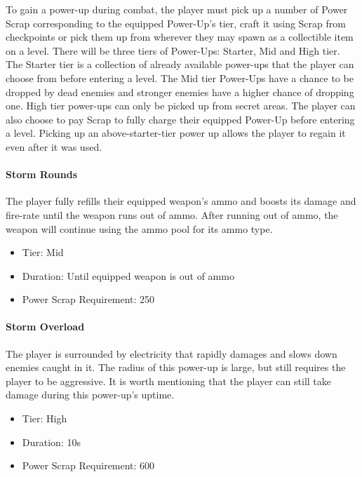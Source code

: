 \documentclass[12pt]{article}
\begin{document}
To gain a power-up during combat, the player must pick up a number of Power Scrap corresponding to the equipped Power-Up's tier, craft it using Scrap from checkpoints or pick them up from wherever they may spawn as a collectible item on a level. There will be three tiers of Power-Ups: Starter, Mid and High tier. The Starter tier is a collection of already available power-ups that the player can choose from before entering a level. The Mid tier Power-Ups have a chance to be dropped by dead enemies and stronger enemies have a higher chance of dropping one. High tier power-ups can only be picked up from secret areas. The player can also choose to pay Scrap to fully charge their equipped Power-Up before entering a level. Picking up an above-starter-tier power up allows the player to regain it even after it was used. 

\paragraph{Storm Rounds}

The player fully refills their equipped weapon's ammo and boosts its damage and fire-rate until the weapon runs out of ammo. After running out of ammo, the weapon will continue using the ammo pool for its ammo type. 

\begin{itemize}
	\item Tier: Mid
	\item Duration: Until equipped weapon is out of ammo
	\item Power Scrap Requirement: 250
\end{itemize}

\paragraph{Storm Overload}

The player is surrounded by electricity that rapidly damages and slows down enemies caught in it. The radius of this power-up is large, but still requires the player to be aggressive. It is worth mentioning that the player can still take damage during this power-up's uptime. 

\begin{itemize}
	\item Tier: High
	\item Duration: 10s
	\item Power Scrap Requirement: 600
\end{itemize}
\end{document}
